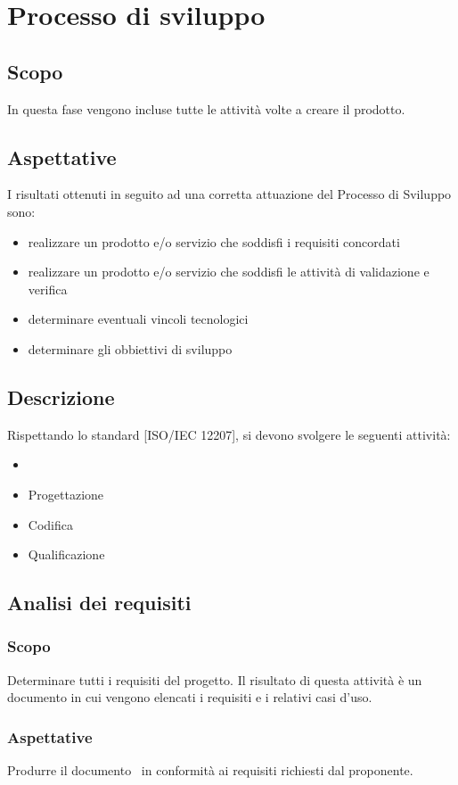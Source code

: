 \documentclass[../NormeDiProgetto.tex]{subfiles}
\begin{document}
	\section{Processo di sviluppo}
		\subsection{Scopo}
			In questa fase vengono incluse tutte le attività volte a creare il prodotto.
		\subsection{Aspettative}
			I risultati ottenuti in seguito ad una corretta attuazione del Processo di Sviluppo sono:
			\begin{itemize}
				\item realizzare un prodotto e/o servizio che soddisfi i requisiti concordati
				\item realizzare un prodotto e/o servizio che soddisfi le attività di validazione e verifica
				\item determinare eventuali vincoli tecnologici
				\item determinare gli obbiettivi di sviluppo
			\end{itemize}
		\subsection{Descrizione}
			Rispettando lo standard [ISO/IEC 12207], si devono svolgere le seguenti attività:
			\begin{itemize}
				\item \analisideirequisiti\
				\item Progettazione
				\item Codifica
				\item Qualificazione
			\end{itemize}
		\subsection{Analisi dei requisiti}
			\subsubsection{Scopo}
				Determinare tutti i requisiti del progetto. Il risultato di questa attività è un documento in cui vengono elencati i requisiti e i relativi casi d'uso.
			\subsubsection{Aspettative}
				Produrre il documento \analisideirequisiti\ in conformità ai requisiti richiesti dal proponente.
\end{document}
